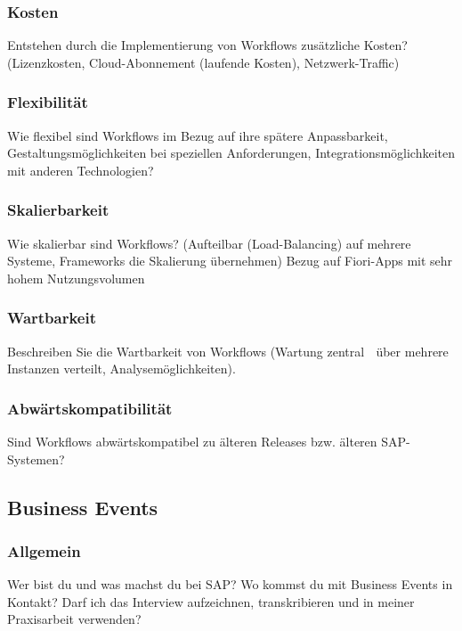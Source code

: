 \subsubsection{Kosten}

Entstehen durch die Implementierung von Workflows zusätzliche Kosten? (Lizenzkosten, Cloud-Abonnement (laufende Kosten), Netzwerk-Traffic)

\subsubsection{Flexibilität}

Wie flexibel sind Workflows im Bezug auf ihre spätere Anpassbarkeit, Gestaltungsmöglichkeiten bei speziellen Anforderungen, Integrationsmöglichkeiten mit anderen Technologien?

\subsubsection{Skalierbarkeit}

Wie skalierbar sind Workflows? (Aufteilbar (Load-Balancing) auf mehrere Systeme, Frameworks die Skalierung übernehmen) Bezug auf Fiori-Apps mit sehr hohem Nutzungsvolumen

\subsubsection{Wartbarkeit}

Beschreiben Sie die Wartbarkeit von Workflows (Wartung zentral  über mehrere Instanzen verteilt, Analysemöglichkeiten). 

\subsubsection{Abwärtskompatibilität}

Sind Workflows abwärtskompatibel zu älteren Releases bzw. älteren SAP-Systemen?

\subsection{Business Events} \label{FB_Business-Events}

\subsubsection{Allgemein}

Wer bist du und was machst du bei SAP? \newline
Wo kommst du mit Business Events in Kontakt? \newline
Darf ich das Interview aufzeichnen, transkribieren und in meiner Praxisarbeit verwenden?

